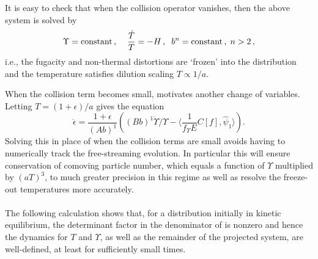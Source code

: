 It is easy to check that when the collision operator vanishes, then the above system is solved by 
\begin{equation}\label{freeStreamSol}
\Upsilon=\text{constant}\,,\hspace{4mm} \frac{\dot T}{T}=-H\,,\hspace{2mm}  b^n=\text{constant}\,,\hspace{1mm} n>2\,,
\end{equation}
i.e., the fugacity and non-thermal distortions are `frozen' into the distribution and the temperature satisfies dilution scaling $T\propto 1/a$.

When the collision term becomes small,  motivates another change of variables. Letting $T=(1+\epsilon)/a$  gives the equation
\begin{equation}
\dot\epsilon=\frac{1+\epsilon}{(Ab)^1}\left((Bb)^1\dot{\Upsilon}/\Upsilon-\langle\frac{1}{f_\Upsilon E}C[f],\hat\psi_1\rangle\right).
\end{equation}
Solving this in place of  when the collision terms are small avoids having to numerically track the free-streaming evolution.  In particular this will ensure conservation of comoving particle number, which equals a function of $\Upsilon$ multiplied by $(aT)^3$, to much greater precision in this regime as well as resolve the freeze-out temperatures more accurately.\\

\\
The following calculation shows that, for a distribution initially in kinetic equilibrium, the determinant factor in the denominator of  is nonzero and hence the dynamics for $T$ and $\Upsilon$, as well as the remainder of the projected system, are well-defined, at least for sufficiently small times. 

